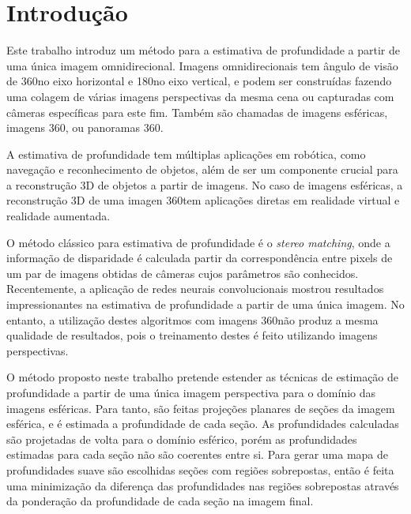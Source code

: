 \documentclass[cic,tc]{iiufrgs}
\begin{document}
\tableofcontents


\chapter{Introdução}

Este trabalho introduz um método para a estimativa de profundidade a partir de uma única imagem omnidirecional. Imagens omnidirecionais tem ângulo de visão de 360\degree no eixo horizontal e 180\degree no eixo vertical, e podem ser construídas fazendo uma colagem de várias imagens perspectivas da mesma cena ou capturadas com câmeras específicas para este fim. Também são chamadas de imagens esféricas, imagens 360\degree, ou panoramas 360\degree.

A estimativa de profundidade tem múltiplas aplicações em robótica, como navegação e reconhecimento de objetos, além de ser um componente crucial para a reconstrução 3D de objetos a partir de imagens. No caso de imagens esféricas, a reconstrução 3D de uma imagen 360\degree tem aplicações diretas em realidade virtual e realidade aumentada.

O método clássico para estimativa de profundidade é o \textit{stereo matching}, onde a informação de disparidade é calculada partir da correspondência entre pixels de um par de imagens obtidas de câmeras cujos parâmetros são conhecidos. Recentemente, a aplicação de redes neurais convolucionais mostrou resultados impressionantes na estimativa de profundidade a partir de uma única imagem. No entanto, a utilização destes algoritmos com imagens 360\degree não produz a mesma qualidade de resultados, pois o treinamento destes é feito utilizando imagens perspectivas.

O método proposto neste trabalho pretende estender as técnicas de estimação de profundidade a partir de uma única imagem perspectiva para o domínio das imagens esféricas. Para tanto, são feitas projeções planares de seções da imagem esférica, e é estimada a profundidade de cada seção. As profundidades calculadas são projetadas de volta para o domínio esférico, porém as profundidades estimadas para cada seção não são coerentes entre si. Para gerar uma mapa de profundidades suave são escolhidas seções com regiões sobrepostas, então é feita uma minimização da diferença das profundidades nas regiões sobrepostas através da ponderação da profundidade de cada seção na imagem final.

\end{document}

